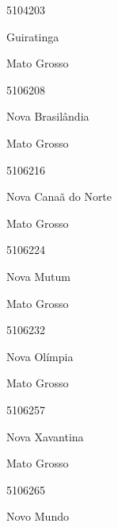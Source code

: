 \documentclass[
  letterpaper,
]{report}
\begin{document}
\n      

5104203

\n      

Guiratinga

\n    

\n    

\n      

Mato Grosso

\n      

5106208

\n      

Nova Brasilândia

\n    

\n    

\n      

Mato Grosso

\n      

5106216

\n      

Nova Canaã do Norte

\n    

\n    

\n      

Mato Grosso

\n      

5106224

\n      

Nova Mutum

\n    

\n    

\n      

Mato Grosso

\n      

5106232

\n      

Nova Olímpia

\n    

\n    

\n      

Mato Grosso

\n      

5106257

\n      

Nova Xavantina

\n    

\n    

\n      

Mato Grosso

\n      

5106265

\n      

Novo Mundo
\end{document}
